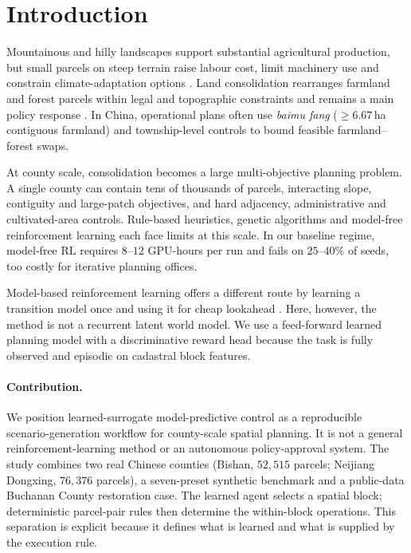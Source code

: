 \documentclass[11pt]{article}
\begin{document}
\section{Introduction}\label{sec:intro}

Mountainous and hilly landscapes support substantial agricultural production, but small parcels on steep terrain raise labour cost, limit machinery use and constrain climate-adaptation options \citep{romeo2020fao,liu2023fragmentation,niu2023fragmentation,foley2011solutions,springmann2018options}. Land consolidation rearranges farmland and forest parcels within legal and topographic constraints and remains a main policy response \citep{liu2014land,long2014rural,rounsevell2014challenges}. In China, operational plans often use \textit{baimu fang} ($\geq 6.67$\,ha contiguous farmland) and township-level controls to bound feasible farmland--forest swaps.

At county scale, consolidation becomes a large multi-objective planning problem. A single county can contain tens of thousands of parcels, interacting slope, contiguity and large-patch objectives, and hard adjacency, administrative and cultivated-area controls. Rule-based heuristics, genetic algorithms \citep{cao2012boundary,deb2002fast,stewart2004multi,aerts2002using} and model-free reinforcement learning \citep{zheng2023urban,equihua2024connectivity,janowicz2020geoai} each face limits at this scale. In our baseline regime, model-free RL requires $8$--$12$ GPU-hours per run and fails on $25$--$40\%$ of seeds, too costly for iterative planning offices.

Model-based reinforcement learning offers a different route by learning a transition model once and using it for cheap lookahead \citep{chua2018deep,janner2019trust}. Here, however, the method is not a recurrent latent world model. We use a feed-forward learned planning model with a discriminative reward head because the task is fully observed and episodic on cadastral block features.

\paragraph{Contribution.} We position learned-surrogate model-predictive control as a reproducible scenario-generation workflow for county-scale spatial planning. It is not a general reinforcement-learning method or an autonomous policy-approval system. The study combines two real Chinese counties (Bishan, $52{,}515$ parcels; Neijiang Dongxing, $76{,}376$ parcels), a seven-preset synthetic benchmark and a public-data Buchanan County restoration case. The learned agent selects a spatial block; deterministic parcel-pair rules then determine the within-block operations. This separation is explicit because it defines what is learned and what is supplied by the execution rule.
\end{document}

